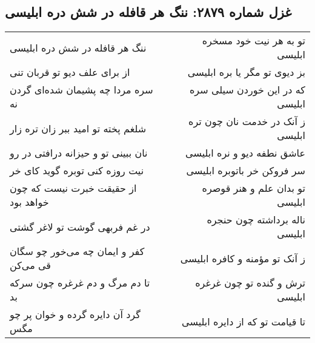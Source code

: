 \begin{center}
\section*{غزل شماره ۲۸۷۹: ننگ هر قافله در شش دره ابلیسی}
\label{sec:2879}
\begin{longtable}{l p{0.5cm} r}
ننگ هر قافله در شش دره ابلیسی
&&
تو به هر نیت خود مسخره ابلیسی
\\
از برای علف دیو تو قربان تنی
&&
بز دیوی تو مگر یا بره ابلیسی
\\
سره مردا چه پشیمان شده‌ای گردن نه
&&
که در این خوردن سیلی سره ابلیسی
\\
شلغم پخته تو امید ببر زان تره زار
&&
ز آنک در خدمت نان چون تره ابلیسی
\\
نان ببینی تو و حیزانه درافتی در رو
&&
عاشق نطفه دیو و نره ابلیسی
\\
نیت روزه کنی توبره گوید کای خر
&&
سر فروکن خر باتوبره ابلیسی
\\
از حقیقت خبرت نیست که چون خواهد بود
&&
تو بدان علم و هنر قوصره ابلیسی
\\
در غم فربهی گوشت تو لاغر گشتی
&&
ناله برداشته چون حنجره ابلیسی
\\
کفر و ایمان چه می‌خور چو سگان قی می‌کن
&&
ز آنک تو مؤمنه و کافره ابلیسی
\\
تا دم مرگ و دم غرغره چون سرکه بد
&&
ترش و گنده تو چون غرغره ابلیسی
\\
گرد آن دایره گرده و خوان پر چو مگس
&&
تا قیامت تو که از دایره ابلیسی
\\
\end{longtable}
\end{center}
